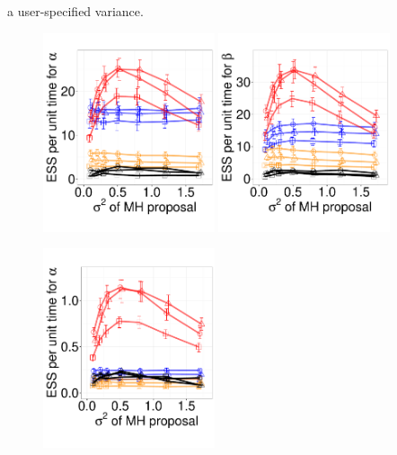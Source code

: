 a user-specified variance.
  \begin{figure}[H]
    \vspace{-.2in}
  \centering
  \begin{minipage}[!hp]{0.7\linewidth}
  \centering
  \begin{minipage}[!hp]{0.99\linewidth}
    \includegraphics [width=0.45\textwidth, angle=0]{figs/exp_3_alpha.pdf}
    \includegraphics [width=0.45\textwidth, angle=0]{figs/exp_3_beta.pdf}
  \end{minipage}
  \centering
  \begin{minipage}[!hp]{0.99\linewidth}
   \vspace{-.3in}
    \includegraphics [width=0.45\textwidth, angle=0]{figs/exp_10_alpha.pdf}

\end{minipage}
\end{minipage}
\end{figure}
